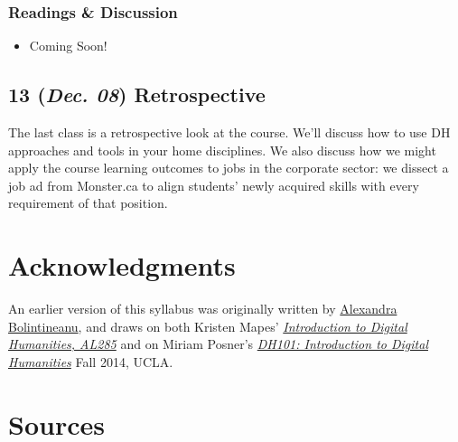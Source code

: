 \documentclass[11pt]{article}
\begin{document}
\subsubsection*{Readings \& Discussion}
\label{sec:org34470dd}
\begin{itemize}
\item Coming Soon!
\end{itemize}
\subsection*{13 (\textit{Dec. 08}) Retrospective}
\label{sec:org7a4c9c0}
The last class is a retrospective look at the course. We'll discuss how to use DH approaches and tools in your home disciplines. We also discuss how we might apply the course learning outcomes to jobs in the corporate sector: we dissect a job ad from Monster.ca to align students' newly acquired skills with every requirement of that position.

\section*{Acknowledgments}
\label{sec:org2f69ab5}
An earlier version of this syllabus was originally written by \href{https://alexandrabolintineanu.wordpress.com/}{Alexandra Bolintineanu}, and draws on both Kristen Mapes' \emph{\href{http://dx.doi.org/10.17613/M6H34B}{Introduction to Digital Humanities, AL285}} and on Miriam Posner's \emph{\href{http://dh101.humanities.ucla.edu/}{DH101: Introduction to Digital Humanities}} Fall 2014, UCLA.


\section*{Sources}
\label{sec:org7b02481}
\end{document}
